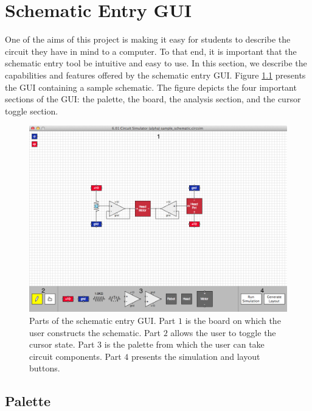 
\chapter{Schematic Entry GUI}
\label{app:gui}

One of the aims of this project is making it easy for students to describe the
circuit they have in mind to a computer. To that end, it is important that the
schematic entry tool be intuitive and easy to use. In this section, we
describe the capabilities and features offered by the schematic entry GUI.
Figure \ref{fig:gui} presents the GUI containing a sample
schematic. The figure depicts the four important sections of the GUI: the
palette, the board, the analysis section, and the cursor toggle section.

\begin{figure}
\begin{center}
\includegraphics[width=\textwidth]{Images/gui.png}
\caption[Schematic entry GUI parts]{Parts of the schematic entry GUI. Part $1$
is the board on which the user constructs the schematic. Part $2$ allows the
user to toggle the cursor state. Part $3$ is the palette from which the user can
take circuit components. Part $4$ presents the simulation and layout buttons.}
\label{fig:gui}
\end{center}
\end{figure}

\section{Palette}


